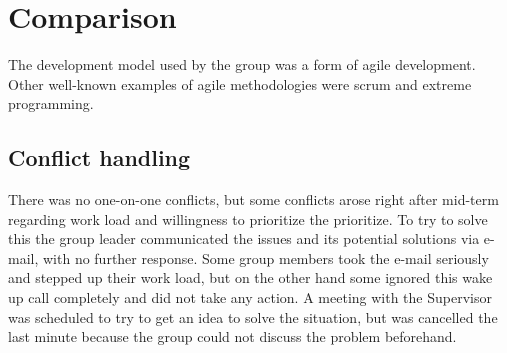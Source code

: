 \section{Comparison}
The development model used by the group was a form of agile development. Other well-known examples of agile methodologies were scrum and extreme programming. 
%
\subsection{Conflict handling}
There was no one-on-one conflicts, but some conflicts arose right after mid-term regarding work load and willingness to prioritize the prioritize. To try to solve this the group leader communicated the issues and its potential solutions via e-mail, with no further response. Some group members took the e-mail seriously and stepped up their work load, but on the other hand some ignored this wake up call completely and did not take any action. A meeting with the Supervisor was scheduled to try to get an idea to solve the situation, but was cancelled the last minute because the group could not discuss the problem beforehand.
%